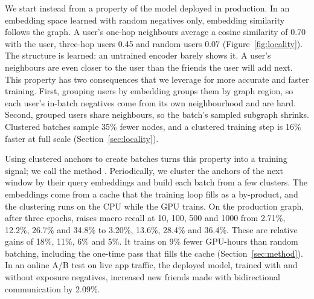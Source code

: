  We start instead from a property of the model deployed in production. 
In an embedding space learned with random negatives only, embedding similarity follows the graph. A user's one-hop
neighbours average a cosine similarity of 0.70 with the user, three-hop users 0.45 and random users 0.07
(Figure~\ref{fig:locality}). The structure is learned: an untrained encoder barely shows it. 
A user's neighbours are even closer to the user than the friends the user will add next. This property has two consequences that we leverage for more accurate and faster training.
First, grouping users by embedding groups them by graph region, so each user's in-batch negatives come from its own
neighbourhood and are hard. Second, grouped users share neighbours, so the batch's sampled subgraph shrinks. Clustered
batches sample 35\% fewer nodes, and a clustered training step is 16\% faster at full scale
(Section~\ref{sec:locality}).

 Using clustered anchors to create batches turns this property into a training signal;
we call the method \ours{}. Periodically, we cluster the anchors of the next window by their query embeddings and build
each batch from a few clusters. The embeddings come from a cache that the training loop fills as a by-product, and the
clustering runs on the CPU while the GPU trains. On the production graph, after three epochs, \ours{} raises macro recall
at 10, 100, 500 and 1000 from 2.71\%, 12.2\%, 26.7\% and 34.8\% to 3.20\%, 13.6\%, 28.4\% and 36.4\%. These are relative
gains of 18\%, 11\%, 6\% and 5\%. It trains on 9\% fewer GPU-hours than random batching, including the one-time pass that
fills the cache (Section~\ref{sec:method}). In an online A/B test on live app traffic, the deployed model, trained with
\ours{} and without exposure negatives, increased new friends made with bidirectional communication by 2.09\%.

